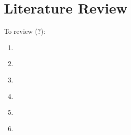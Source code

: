 \chapter{Literature Review}

To review (?):

\begin{enumerate}
    \item~\cite{ahmed2022verifix}
    \item~\cite{chen2021evaluating}
    \item~\cite{fan2022improving}
    \item~\cite{haldeman2021automated}
    \item~\cite{hu2019re}
    \item~\cite{zhang2022repairing}
\end{enumerate}